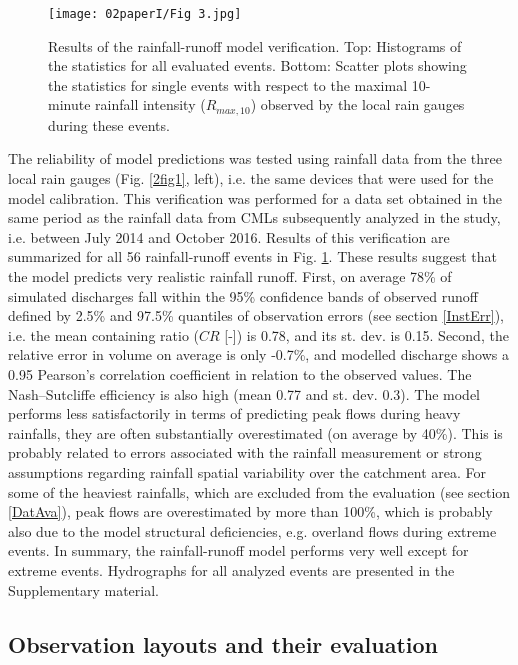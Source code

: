 \documentclass{ctuthesis}\usepackage[]{graphicx}\usepackage[]{color}
\begin{document}
\begin{figure}[h]
\begin{center}
\texttt{[image: 02paperI/Fig 3.jpg]}
\caption{Results of the rainfall-runoff model verification. Top: Histograms of the statistics for all evaluated events. Bottom: Scatter plots showing the statistics for single events with respect to the maximal 10-minute rainfall intensity ($R_{max,10}$) observed by the local rain gauges during these events.} \label{2fig3}
\end{center}
\end{figure}

The reliability of model predictions was tested using rainfall data from the three local rain gauges (Fig. \ref{2fig1}, left), i.e. the same devices that were used for the model calibration. This verification was performed for a data set obtained in the same period as the rainfall data from CMLs subsequently analyzed in the study, i.e. between July 2014 and October 2016. Results of this verification are summarized for all 56 rainfall-runoff events in Fig. \ref{2fig3}. These results suggest that the model predicts very realistic rainfall runoff. First, on average 78\% of simulated discharges fall within the 95\% confidence bands of observed runoff defined by 2.5\% and 97.5\% quantiles of observation errors (see section \ref{InstErr}), i.e. the mean containing ratio ($CR$ [-]) is 0.78, and its st. dev. is 0.15. Second, the relative error in volume on average is only -0.7\%, and modelled discharge shows a 0.95 Pearson's correlation coefficient in relation to the observed values. The Nash–Sutcliffe efficiency is also high (mean 0.77 and st. dev. 0.3). The model performs less satisfactorily in terms of predicting peak flows during heavy rainfalls, they are often substantially overestimated (on average by 40\%). This is probably related to errors associated with the rainfall measurement or strong assumptions regarding rainfall spatial variability over the catchment area. For some of the heaviest rainfalls, which are excluded from the evaluation (see section \ref{DatAva}), peak flows are overestimated by more than 100\%, which is probably also due to the model structural deficiencies, e.g. overland flows during extreme events. In summary, the rainfall-runoff model performs very well except for extreme events. Hydrographs for all analyzed events are presented in the Supplementary material. 

\subsection{Observation layouts and their evaluation} \label{ObsLay}
\end{document}
